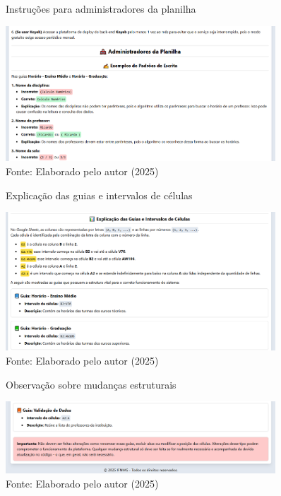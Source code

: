 \begin{figure}[htb]
    \centering
    \caption{Instruções para administradores da planilha}
    \includegraphics[width=0.9\textwidth]{Figuras/doc-2.png}
    \caption*{Fonte: Elaborado pelo autor (2025)}
    \label{fig_doc_2}
\end{figure}

\begin{figure}[htb]
    \centering
    \caption{Explicação das guias e intervalos de células}
    \includegraphics[width=0.9\textwidth]{Figuras/doc-3.png}
    \caption*{Fonte: Elaborado pelo autor (2025)}
    \label{fig_doc_3}
\end{figure}

\begin{figure}[htb]
    \centering
    \caption{Observação sobre mudanças estruturais}
    \includegraphics[width=0.9\textwidth]{Figuras/doc-4.png}
    \caption*{Fonte: Elaborado pelo autor (2025)}
    \label{fig_doc_4}
\end{figure}